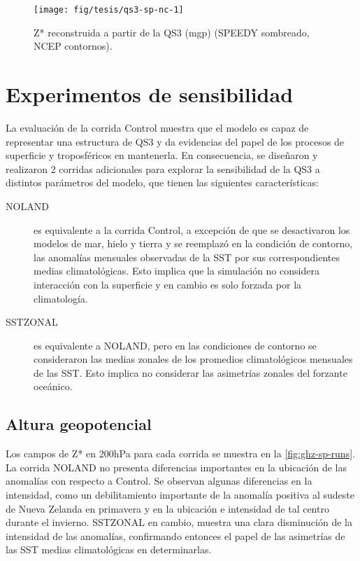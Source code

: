\documentclass[spanish,a4paper,12pt,oneside]{book}
\begin{document}
\begin{figure}
\texttt{[image: fig/tesis/qs3-sp-nc-1]} \caption{Z* reconstruida a partir de la QS3 (mgp) (SPEEDY sombreado, NCEP contornos).}\label{fig:qs3-sp-nc}
\end{figure}

\section{Experimentos de
sensibilidad}\label{experimentos-de-sensibilidad}

La evaluación de la corrida Control muestra que el modelo es capaz de
representar una estructura de QS3 y da evidencias del papel de los
procesos de superficie y troposféricos en mantenerla. En consecuencia,
se diseñaron y realizaron 2 corridas adicionales para explorar la
sensibilidad de la QS3 a distintos parámetros del modelo, que tienen las
siguientes características:

\begin{description}

\item[NOLAND]
 es equivalente a la corrida Control, a excepción de que se desactivaron los modelos de mar, hielo y tierra y se reemplazó en la condición de contorno, las anomalías mensuales observadas de la SST por sus correspondientes medias climatológicas. Esto implica que la simulación no considera interacción con la superficie y en cambio es solo forzada por la climatología.
 
\item[SSTZONAL]

 es equivalente a NOLAND, pero en las condiciones de contorno se consideraron las medias zonales de los promedios climatológicos mensuales de las SST. Esto implica no considerar las asimetrías zonales del forzante oceánico.

\end{description}

\subsection{Altura geopotencial}\label{altura-geopotencial-2}

Los campos de Z* en 200hPa para cada corrida se muestra en la
\autoref{fig:ghz-sp-runs}. La corrida NOLAND no presenta diferencias
importantes en la ubicación de las anomalías con respecto a Control. Se
observan algunas diferencias en la intensidad, como un debilitamiento
importante de la anomalía positiva al sudeste de Nueva Zelanda en
primavera y en la ubicación e intensidad de tal centro durante el
invierno. SSTZONAL en cambio, muestra una clara disminución de la
intensidad de las anomalías, confirmando entonces el papel de las
asimetrías de las SST medias climatológicas en determinarlas.
\end{document}
